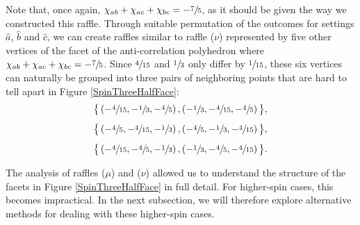 Note that, once again, $\chi_{ab} + \chi_{ac} + \chi_{bc} =- \sfrac75$, as it should be given the way we constructed this raffle. Through suitable permutation of the outcomes for settings $\hat{a}$,  $\hat{b}$ and  $\hat{c}$, we can create raffles similar to raffle ($\nu$) represented by five other vertices of the facet of the anti-correlation polyhedron where $\chi_{ab} + \chi_{ac} + \chi_{bc} =- \sfrac75$. Since $\sfrac{4}{15}$ and $\sfrac13$ only differ by $\sfrac{1}{15}$, these six vertices can naturally be grouped into three pairs of neighboring points that are hard to tell apart in Figure \ref{SpinThreeHalfFace}:
\begin{equation}
\begin{array}{c}
\big\{ \left( -\sfrac{4}{15}, -\sfrac{1}{3}, -\sfrac{4}{5} \right), \left( -\sfrac{1}{3}, -\sfrac{4}{15}, -\sfrac{4}{5} \right) \big\}, \\[.3 cm]
\big\{ \left( -\sfrac{4}{5}, -\sfrac{4}{15}, -\sfrac{1}{3} \right), \left( -\sfrac{4}{5}, -\sfrac{1}{3}, -\sfrac{4}{15} \right) \big\},  \\[.3 cm]
\big\{ \left( -\sfrac{4}{15}, -\sfrac{4}{5}, -\sfrac{1}{3} \right),  \left( -\sfrac{1}{3}, -\sfrac{4}{5}, -\sfrac{4}{15} \right) \big\}.
\end{array}
\label{six vertices raffle nu}
\end{equation} 

The analysis of raffles ($\mu$) and ($\nu$) allowed us to understand the structure of the facets in Figure \ref{SpinThreeHalfFace} 
in full detail.
For higher-spin cases, this becomes impractical. In the next subsection, we will therefore explore alternative methods for dealing with these higher-spin cases.

